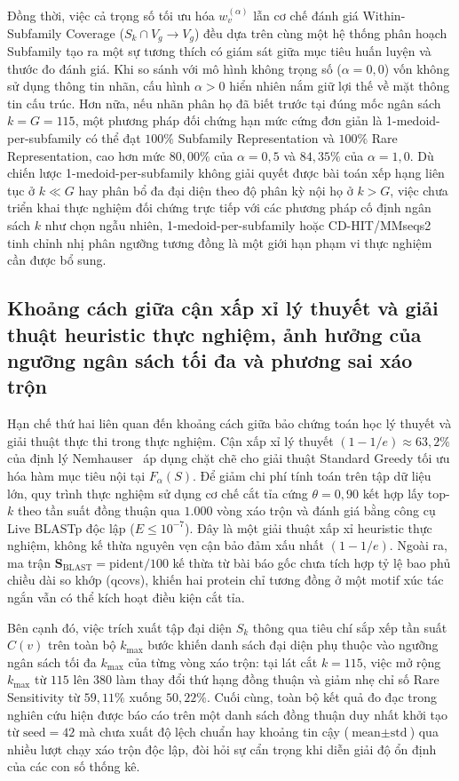 Đồng thời, việc cả trọng số tối ưu hóa $w_v^{(\alpha)}$ lẫn cơ chế đánh giá Within-Subfamily Coverage ($S_k \cap V_g \to V_g$) đều dựa trên cùng một hệ thống phân hoạch Subfamily tạo ra một sự tương thích có giám sát giữa mục tiêu huấn luyện và thước đo đánh giá. Khi so sánh với mô hình không trọng số ($\alpha = 0{,}0$) vốn không sử dụng thông tin nhãn, cấu hình $\alpha > 0$ hiển nhiên nắm giữ lợi thế về mặt thông tin cấu trúc. Hơn nữa, nếu nhãn phân họ đã biết trước tại đúng mốc ngân sách $k = G = 115$, một phương pháp đối chứng hạn mức cứng đơn giản là 1-medoid-per-subfamily có thể đạt $100\%$ Subfamily Representation và $100\%$ Rare Representation, cao hơn mức $80{,}00\%$ của $\alpha = 0{,}5$ và $84{,}35\%$ của $\alpha = 1{,}0$. Dù chiến lược 1-medoid-per-subfamily không giải quyết được bài toán xếp hạng liên tục ở $k \ll G$ hay phân bổ đa đại diện theo độ phân kỳ nội họ ở $k > G$, việc chưa triển khai thực nghiệm đối chứng trực tiếp với các phương pháp cố định ngân sách $k$ như chọn ngẫu nhiên, 1-medoid-per-subfamily hoặc CD-HIT/MMseqs2 tinh chỉnh nhị phân ngưỡng tương đồng là một giới hạn phạm vi thực nghiệm cần được bổ sung.

\subsection{Khoảng cách giữa cận xấp xỉ lý thuyết và giải thuật heuristic thực nghiệm, ảnh hưởng của ngưỡng ngân sách tối đa và phương sai xáo trộn}
\label{subsec:lim_static_hyperparams}

Hạn chế thứ hai liên quan đến khoảng cách giữa bảo chứng toán học lý thuyết và giải thuật thực thi trong thực nghiệm. Cận xấp xỉ lý thuyết $(1 - 1/e) \approx 63{,}2\%$ của định lý Nemhauser~\cite{nemhauser1978} áp dụng chặt chẽ cho giải thuật Standard Greedy tối ưu hóa hàm mục tiêu nội tại $F_\alpha(S)$. Để giảm chi phí tính toán trên tập dữ liệu lớn, quy trình thực nghiệm sử dụng cơ chế cắt tỉa cứng $\theta = 0{,}90$ kết hợp lấy top-$k$ theo tần suất đồng thuận qua $1.000$ vòng xáo trộn và đánh giá bằng công cụ Live BLASTp độc lập ($E \le 10^{-7}$). Đây là một giải thuật xấp xỉ heuristic thực nghiệm, không kế thừa nguyên vẹn cận bảo đảm xấu nhất $(1 - 1/e)$. Ngoài ra, ma trận $\mathbf{S}_{\text{BLAST}} = \text{pident}/100$ kế thừa từ bài báo gốc chưa tích hợp tỷ lệ bao phủ chiều dài so khớp (qcovs), khiến hai protein chỉ tương đồng ở một motif xúc tác ngắn vẫn có thể kích hoạt điều kiện cắt tỉa.

Bên cạnh đó, việc trích xuất tập đại diện $S_k$ thông qua tiêu chí sắp xếp tần suất $C(v)$ trên toàn bộ $k_{\max}$ bước khiến danh sách đại diện phụ thuộc vào ngưỡng ngân sách tối đa $k_{\max}$ của từng vòng xáo trộn: tại lát cắt $k = 115$, việc mở rộng $k_{\max}$ từ $115$ lên $380$ làm thay đổi thứ hạng đồng thuận và giảm nhẹ chỉ số Rare Sensitivity từ $59{,}11\%$ xuống $50{,}22\%$. Cuối cùng, toàn bộ kết quả đo đạc trong nghiên cứu hiện được báo cáo trên một danh sách đồng thuận duy nhất khởi tạo từ $\text{seed} = 42$ mà chưa xuất độ lệch chuẩn hay khoảng tin cậy ($\text{mean} \pm \text{std}$) qua nhiều lượt chạy xáo trộn độc lập, đòi hỏi sự cẩn trọng khi diễn giải độ ổn định của các con số thống kê.

